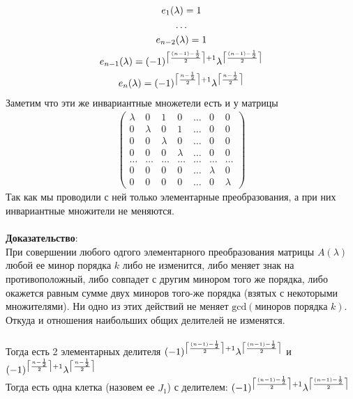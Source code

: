 		\begin{gather*}
			e_1(\lambda) = 1\\
			\ldots\\
			e_{n-2}(\lambda) = 1\\
			e_{n-1}(\lambda) = (-1)^{\ceil[\big]{\frac{(n-1)-\frac{1}{2}}{2}} + 1}\lambda^{\ceil[\big]{\frac{(n-1)-\frac{1}{2}}{2}}}\\
			e_{n}(\lambda) = (-1)^{\ceil[\big]{\frac{n-\frac{1}{2}}{2}} + 1}\lambda^{\ceil[\big]{\frac{n-\frac{1}{2}}{2}}}
		\end{gather*}
		Заметим что эти же инвариантные множетели есть и у матрицы
		\begin{gather*}
			\begin{pmatrix}
				\lambda & 0 & 1 & 0 & \ldots & 0 & 0 \\
				0 & \lambda & 0 & 1 & \ldots & 0 & 0 \\
				0 & 0 & \lambda & 0 & \ldots & 0 & 0 \\
				0 & 0 & 0 & \lambda & \ldots & 0 & 0 \\
				\ldots & \ldots & \ldots & \ldots & \ldots & \ldots & \ldots\\
				0 & 0 & 0 & 0 & \ldots & \lambda & 0 \\
				0 & 0 & 0 & 0 & \ldots & 0 & \lambda
			\end{pmatrix}
		\end{gather*}
		Так как мы проводили с ней только элементарные преобразования, а при них инвариантные множители не меняются.\\
		\\
		\textbf{Доказательство}:\\
		При совершении любого одгого элементарного преобразования матрицы $A(\lambda)$ любой ее минор порядка $k$ либо не изменится, либо меняет знак на противоположный, либо совпадет с другим минором того же порядка, либо окажется равным сумме двух миноров того-же порядка (взятых с некоторыми множителями). Ни одно из этих действий не меняет $\text{gcd}(\text{миноров порядка }k)$. Откуда и отношения наибольших общих делителей не изменятся.\\
		\\
		Тогда есть 2 элементарных делителя $(-1)^{\ceil[\big]{\frac{(n-1)-\frac{1}{2}}{2}} + 1}\lambda^{\ceil[\big]{\frac{(n-1)-\frac{1}{2}}{2}}}$ и $(-1)^{\ceil[\big]{\frac{n-\frac{1}{2}}{2}} + 1}\lambda^{\ceil[\big]{\frac{n-\frac{1}{2}}{2}}}$\\
		Тогда есть одна клетка (назовем ее $J_1$) с делителем: $(-1)^{\ceil[\big]{\frac{(n-1)-\frac{1}{2}}{2}} + 1}\lambda^{\ceil[\big]{\frac{(n-1)-\frac{1}{2}}{2}}}$\\
